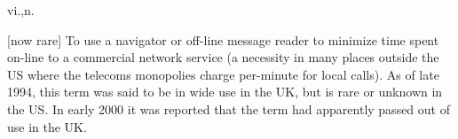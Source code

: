  vi.,n.

[now rare] To use a navigator or off-line message reader to minimize time spent
on-line to a commercial network service (a necessity in many places outside the
US where the telecoms monopolies charge per-minute for local
calls). As of late 1994, this term was said to be in wide use in the UK, but is
rare or unknown in the US. In early 2000 it was reported that the term had
apparently passed out of use in the UK.


